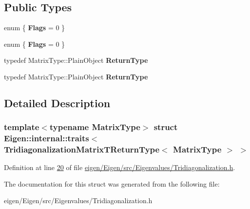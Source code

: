 \subsection*{Public Types}
\begin{DoxyCompactItemize}
\item 
\mbox{\label{struct_eigen_1_1internal_1_1traits_3_01_tridiagonalization_matrix_t_return_type_3_01_matrix_type_01_4_01_4_abbd1eb6e53a6126f8dd60fa8175de9b3}} 
enum \{ {\bfseries Flags} = 0
 \}
\item 
\mbox{\label{struct_eigen_1_1internal_1_1traits_3_01_tridiagonalization_matrix_t_return_type_3_01_matrix_type_01_4_01_4_adcd1957eec4667ddbde2b284abacef7d}} 
enum \{ {\bfseries Flags} = 0
 \}
\item 
\mbox{\label{struct_eigen_1_1internal_1_1traits_3_01_tridiagonalization_matrix_t_return_type_3_01_matrix_type_01_4_01_4_ac98c68554cfb85855f7b85299983aec9}} 
typedef Matrix\+Type\+::\+Plain\+Object {\bfseries Return\+Type}
\item 
\mbox{\label{struct_eigen_1_1internal_1_1traits_3_01_tridiagonalization_matrix_t_return_type_3_01_matrix_type_01_4_01_4_ac98c68554cfb85855f7b85299983aec9}} 
typedef Matrix\+Type\+::\+Plain\+Object {\bfseries Return\+Type}
\end{DoxyCompactItemize}


\subsection{Detailed Description}
\subsubsection*{template$<$typename Matrix\+Type$>$\newline
struct Eigen\+::internal\+::traits$<$ Tridiagonalization\+Matrix\+T\+Return\+Type$<$ Matrix\+Type $>$ $>$}



Definition at line \hyperlink{eigen_2_eigen_2src_2_eigenvalues_2_tridiagonalization_8h_source_l00020}{20} of file \hyperlink{eigen_2_eigen_2src_2_eigenvalues_2_tridiagonalization_8h_source}{eigen/\+Eigen/src/\+Eigenvalues/\+Tridiagonalization.\+h}.



The documentation for this struct was generated from the following file\+:\begin{DoxyCompactItemize}
\item 
eigen/\+Eigen/src/\+Eigenvalues/\+Tridiagonalization.\+h\end{DoxyCompactItemize}
